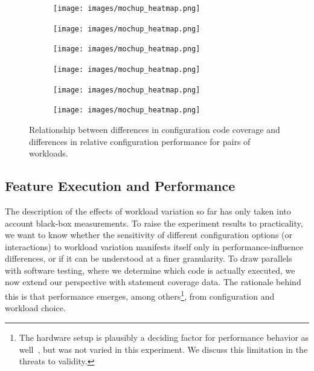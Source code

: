\begin{figure}
	\centering
	\begin{subfigure}{0.33\textwidth}
		\centering
		\texttt{[image: images/mochup\_heatmap.png]}
		\caption{\batik}
	\end{subfigure}
	\begin{subfigure}{0.33\textwidth}
		\centering
		\texttt{[image: images/mochup\_heatmap.png]}
		\caption{\dconvert}
	\end{subfigure}
	\begin{subfigure}{0.33\textwidth}
		\centering
		\texttt{[image: images/mochup\_heatmap.png]}
		\caption{\htwo}
	\end{subfigure}
	\begin{subfigure}{0.33\textwidth}
		\centering
		\texttt{[image: images/mochup\_heatmap.png]}
		\caption{\jumper}
	\end{subfigure}
	\begin{subfigure}{0.33\textwidth}
		\centering
		\texttt{[image: images/mochup\_heatmap.png]}
		\caption{\jadx}
	\end{subfigure}
	\begin{subfigure}{0.33\textwidth}
		\centering
		\texttt{[image: images/mochup\_heatmap.png]}
		\caption{\kanzi}
	\end{subfigure}
	\caption{Relationship between differences in configuration code coverage and differences in relative configuration performance for pairs of workloads.}
	\label{fig:diff_performance_distribution}
\end{figure}

\subsection{Feature Execution and Performance}
The description of the effects of workload variation so far has only taken into account black-box measurements. To raise the experiment results to practicality, we want to know whether the sensitivity of different configuration options (or interactions) to workload variation manifests itself only in performance-influence differences, or if it can be understood at a finer granularity. To draw parallels with software testing, where we determine which code is actually executed, we now extend our perspective with statement coverage data. The rationale behind this is that performance emerges, among others\footnote{The hardware setup is plausibly a deciding factor for performance behavior as well~\cite{jamishidi_transfer_2017}, but was not varied in this experiment. We discuss this limitation in the threats to validity.}, from configuration and workload choice.

